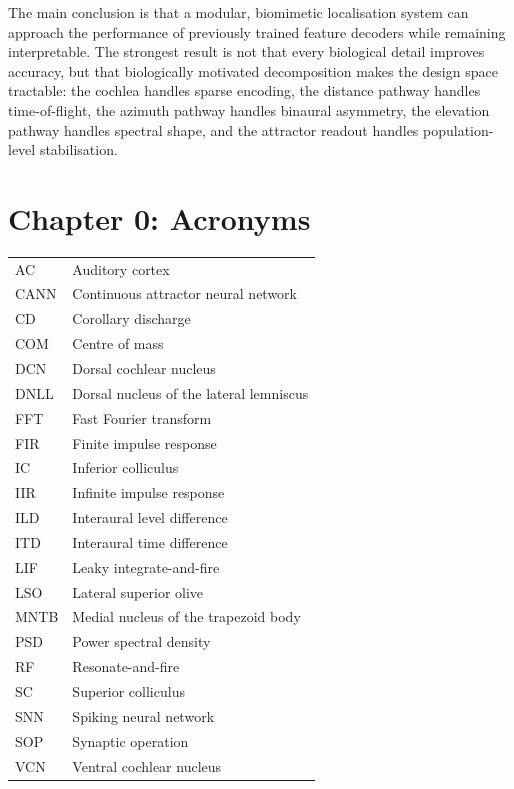 \documentclass[12pt,a4paper]{report}
\begin{document}
The main conclusion is that a modular, biomimetic localisation system can approach the performance of previously trained feature decoders while remaining interpretable. The strongest result is not that every biological detail improves accuracy, but that biologically motivated decomposition makes the design space tractable: the cochlea handles sparse encoding, the distance pathway handles time-of-flight, the azimuth pathway handles binaural asymmetry, the elevation pathway handles spectral shape, and the attractor readout handles population-level stabilisation.

\tableofcontents
\clearpage
{}

\chapter*{Chapter 0: Acronyms}

\begin{tabular}{ll}
  AC & Auditory cortex\\
  CANN & Continuous attractor neural network\\
  CD & Corollary discharge\\
  COM & Centre of mass\\
  DCN & Dorsal cochlear nucleus\\
  DNLL & Dorsal nucleus of the lateral lemniscus\\
  FFT & Fast Fourier transform\\
  FIR & Finite impulse response\\
  IC & Inferior colliculus\\
  IIR & Infinite impulse response\\
  ILD & Interaural level difference\\
  ITD & Interaural time difference\\
  LIF & Leaky integrate-and-fire\\
  LSO & Lateral superior olive\\
  MNTB & Medial nucleus of the trapezoid body\\
  PSD & Power spectral density\\
  RF & Resonate-and-fire\\
  SC & Superior colliculus\\
  SNN & Spiking neural network\\
  SOP & Synaptic operation\\
  VCN & Ventral cochlear nucleus
\end{tabular}
\end{document}
